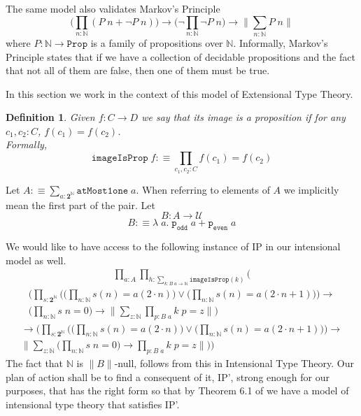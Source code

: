 \documentclass[12pt]{report}
\newtheorem{defn}[thm]{Definition}
\begin{document}
The same model also validates Markov's Principle
$$\Big(\prod_{n : \mathbb{N}}(P\; n + \neg P\; n)\Big) \rightarrow  \Big(\neg \prod_{n : \mathbb{N}}\neg P\; n\Big)\rightarrow \Big\lVert \sum_{n : \mathbb{N}} P\; n \Big\rVert$$
where $P : \mathbb{N} \rightarrow \mathtt{Prop}$ is a family of propositions over $\mathbb{N}$. 
Informally, Markov's Principle states that if we have a collection of decidable propositions and the fact that not all of them are false, then one of them must be true.

In this section we work in the context of this model of Extensional Type Theory.
\begin{defn}
Given $f : C \rightarrow D$ we say that its image is a proposition if for any $c_1,c_2 : C$, $f(c_1) = f(c_2)$.\\
Formally,
$$\mathtt{imageIsProp}\; f :\equiv \prod_{c_1,c_2 : C}f(c_1) = f(c_2)$$
\end{defn}
Let $A :\equiv \sum_{a: \mathbf{2}^\mathbb{N}}\mathtt{atMost1one}\;a$. 
When referring to elements of $A$ we implicitly mean the first part of the pair. 
Let
$$B : A \rightarrow \mathcal{U}$$
$$B :\equiv \lambda\; a.\; \mathtt{p_{odd}}\; a + \mathtt{p_{even}}\; a$$

We would like to have access to the following instance of IP in our intensional model as well.
\begin{multline*}
\prod_{a: A} \prod_{h : \sum_{k : B\;a \rightarrow \mathbb{N}}\mathtt{imageIsProp}(k)} \Bigg( 
\end{multline*}
\begin{multline*}
\bigg( \prod_{s : \mathbf{2}^\mathbb{N}} \Big(\big(\prod_{n : \mathbb{N}} s(n) = a(2 \cdot n)\big) \vee \big(\prod_{n : \mathbb{N}} s(n) = a(2\cdot n +1)\big) \Big) \rightarrow \\
	 \Big(\prod_{n : \mathbb{N}}s\; n = 0 \Big) \rightarrow \Big\lVert \sum_{z : \mathbb{N}}\prod_{p: B\; a}  k\; p = z \Big\rVert \bigg)
\end{multline*}
\begin{multline*}
\rightarrow \bigg( \prod_{s : \mathbf{2}^\mathbb{N}} \Big(\big(\prod_{n : \mathbb{N}} s(n) = a(2 \cdot n)\big) \vee \big(\prod_{n : \mathbb{N}} s(n) = a(2\cdot n +1)\big) \Big) \rightarrow \\
	  \Big\lVert \sum_{z : \mathbb{N}} \Big(\prod_{n : \mathbb{N}}s\; n = 0 \Big) \rightarrow \prod_{p : B\; a} k\; p = z \Big\rVert \bigg) \Bigg)
\end{multline*}
The fact that $\mathbb{N}$ is $\lVert B \rVert$-null, follows from this in Intensional Type Theory. 
Our plan of action shall be to find a consequent of it, IP', strong enough for our purposes, that has the right form so that by Theorem 6.1 of \cite{1905.03014} we have a model of intensional type theory that satisfies IP'. 
\end{document}

